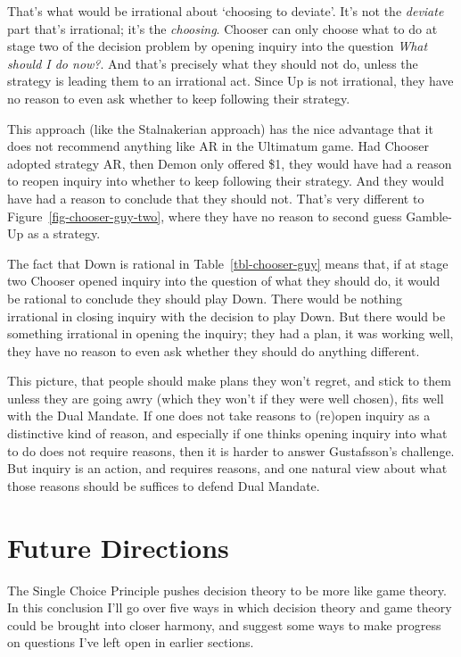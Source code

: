 \documentclass[
  10pt,
  letterpaper,
  DIV=11,
  numbers=noendperiod,
  twoside]{scrartcl}
\begin{document}
That's what would be irrational about `choosing to deviate'. It's not
the \emph{deviate} part that's irrational; it's the \emph{choosing}.
Chooser can only choose what to do at stage two of the decision problem
by opening inquiry into the question \emph{What should I do now?}. And
that's precisely what they should not do, unless the strategy is leading
them to an irrational act. Since Up is not irrational, they have no
reason to even ask whether to keep following their strategy.

This approach (like the Stalnakerian approach) has the nice advantage
that it does not recommend anything like AR in the Ultimatum game. Had
Chooser adopted strategy AR, then Demon only offered \$1, they would
have had a reason to reopen inquiry into whether to keep following their
strategy. And they would have had a reason to conclude that they should
not. That's very different to Figure~\ref{fig-chooser-guy-two}, where
they have no reason to second guess Gamble-Up as a strategy.

The fact that Down is rational in Table~\ref{tbl-chooser-guy} means
that, if at stage two Chooser opened inquiry into the question of what
they should do, it would be rational to conclude they should play Down.
There would be nothing irrational in closing inquiry with the decision
to play Down. But there would be something irrational in opening the
inquiry; they had a plan, it was working well, they have no reason to
even ask whether they should do anything different.

This picture, that people should make plans they won't regret, and stick
to them unless they are going awry (which they won't if they were well
chosen), fits well with the Dual Mandate. If one does not take reasons
to (re)open inquiry as a distinctive kind of reason, and especially if
one thinks opening inquiry into what to do does not require reasons,
then it is harder to answer Gustafsson's challenge. But inquiry is an
action, and requires reasons, and one natural view about what those
reasons should be suffices to defend Dual Mandate.

\section{Future Directions}\label{sec-conclusion}

The Single Choice Principle pushes decision theory to be more like game
theory. In this conclusion I'll go over five ways in which decision
theory and game theory could be brought into closer harmony, and suggest
some ways to make progress on questions I've left open in earlier
sections.
\end{document}
